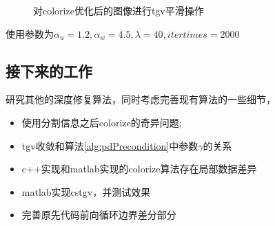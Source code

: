 \documentclass[UTF8]{ctexart}
\begin{document}
\begin{sloppypar}
\begin{figure}[htbp]
{        }
        \caption{\small 对colorize优化后的图像进行tgv平滑操作}
        \label{fig:colorize_tgv}
    \end{figure}
    使用参数为$\alpha_u = 1.2,\alpha_w=4.5,\lambda=40,itertimes=2000$
    \subsection{接下来的工作}
    研究其他的深度修复算法，同时考虑完善现有算法的一些细节，
    \begin{itemize}
        \item 使用分割信息之后colorize的奇异问题;
        \item tgv收敛和算法\ref{alg:pdPrecondition}中参数$\gamma$的关系
        \item c++实现和matlab实现的colorize算法存在局部数据差异
        \item matlab实现cstgv，并测试效果
        \item 完善原先代码前向循环边界差分部分
    \end{itemize}








    

    \end{sloppypar}
\end{document}
